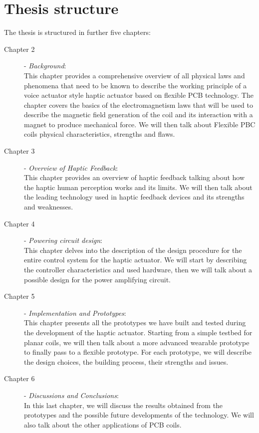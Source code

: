 \section{Thesis structure}
The thesis is structured in further five chapters:
\begin{description}
    \item[Chapter 2] - \textit{Background}:\\ This chapter provides a comprehensive overview of all physical laws and phenomena that need to be known to describe the working principle of a voice actuator style haptic actuator based on flexible PCB technology. The chapter covers the basics of the electromagnetism laws that will be used to describe the magnetic field generation of the coil and its interaction with a magnet to produce mechanical force.
    We will then talk about Flexible PBC coils physical characteristics, strengths and flaws.

    \item[Chapter 3] - \textit{Overview of Haptic Feedback}:\\ This chapter provides an overview of haptic feedback talking about how the haptic human perception works and its limits. We will then talk about the leading technology used in haptic feedback devices and its strengths and weaknesses.

    \item[Chapter 4] - \textit{Powering circuit design}: \\
    This chapter delves into the description of the design procedure for the entire control system for the haptic actuator. We will start by describing the controller characteristics and used hardware, then we will talk about a possible design for the power amplifying circuit.

    \item[Chapter 5] - \textit{Implementation and Prototypes}:\\
    This chapter presents all the prototypes we have built and tested during the development of the haptic actuator. Starting from a simple testbed for planar coils, we will then talk about a more advanced wearable prototype to finally pass to a flexible prototype. For each prototype, we will describe the design choices, the building process, their strengths and issues.


    \item[Chapter 6] - \textit{Discussions and Conclusions}:\\
    In this last chapter, we will discuss the results obtained from the prototypes and the possible future developments of the technology. We will also talk about the other applications of PCB coils.
\end{description}
